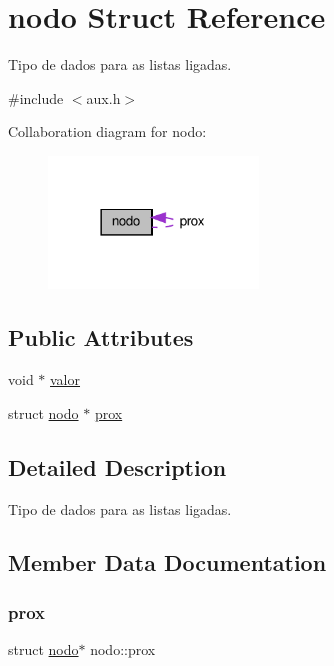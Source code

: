 \hypertarget{structnodo}{}\section{nodo Struct Reference}
\label{structnodo}


Tipo de dados para as listas ligadas.  




{\ttfamily \#include $<$aux.\+h$>$}



Collaboration diagram for nodo\+:
\nopagebreak
\begin{figure}[H]
\begin{center}
\leavevmode
\includegraphics[width=158pt]{structnodo__coll__graph}
\end{center}
\end{figure}
\subsection*{Public Attributes}
\begin{DoxyCompactItemize}
\item 
void $\ast$ \hyperlink{structnodo_ab63adcdb83ea1fdcf4fa10f3cafc4a6a}{valor}
\item 
struct \hyperlink{structnodo}{nodo} $\ast$ \hyperlink{structnodo_a086547621a7da23b916bbe26e0855308}{prox}
\end{DoxyCompactItemize}


\subsection{Detailed Description}
Tipo de dados para as listas ligadas. 

\subsection{Member Data Documentation}
\mbox{\label{structnodo_a086547621a7da23b916bbe26e0855308}} 
\subsubsection{\texorpdfstring{prox}{prox}}
{\footnotesize\ttfamily struct \hyperlink{structnodo}{nodo}$\ast$ nodo\+::prox}

